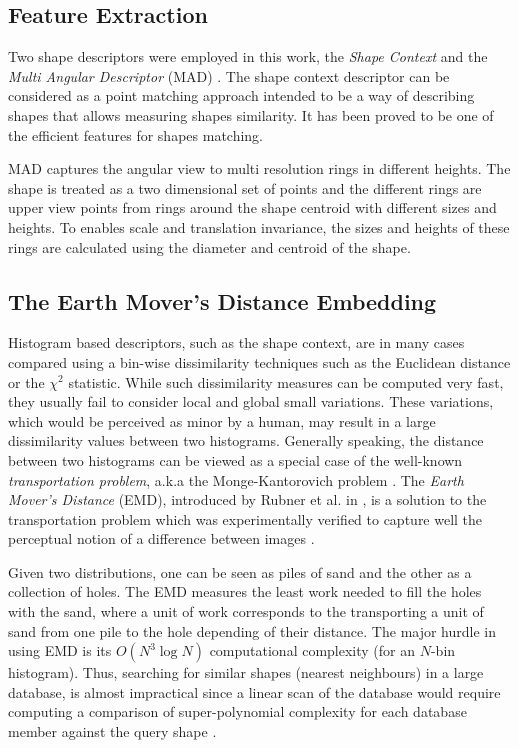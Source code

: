 \documentclass[10pt, conference, compsocconf]{IEEEtran}
\begin{document}
\subsection{Feature Extraction}
Two shape descriptors were employed in this work, the \emph{Shape Context} \cite{belongie2002shape} and the \emph{Multi Angular Descriptor} (MAD) \cite{saabni2013multi}.
The shape context descriptor can be considered as a point matching approach intended to be a way of describing shapes that allows measuring shapes similarity. 
It has been proved to be one of the efficient features for shapes matching.

MAD captures the angular view to multi resolution rings in different heights. 
The shape is treated as a two dimensional set of points and the different rings are upper view points from rings around the shape centroid with different sizes and heights. 
To enables scale and translation invariance, the sizes and heights of these rings are calculated using the diameter and centroid of the shape.

\subsection{The Earth Mover's Distance Embedding}
Histogram based descriptors, such as the shape context, are in many cases compared using a bin-wise dissimilarity techniques such as the Euclidean distance or the $\chi^2$ statistic.
While such dissimilarity measures can be computed very fast, they usually fail to consider local and global small variations. 
These variations, which would be perceived as minor by a human, may result in a large dissimilarity values between two histograms. 
Generally speaking, the distance between two histograms can be viewed as a special case of the well-known \emph{transportation problem}, a.k.a the Monge-Kantorovich problem \cite{rachev1985monge}.
The \emph{Earth Mover's Distance} (EMD), introduced by Rubner et al. in \cite{rubner2000earth}, is a solution to the transportation problem which was experimentally verified to capture well the perceptual notion of a difference between images \cite{grauman2004fast}.

Given two distributions, one can be seen as piles of sand and the other as a collection of holes. 
The EMD measures the least work needed to fill the holes with the sand, where a unit of work corresponds to the transporting a unit of sand from one pile to the hole depending of their distance.
The major hurdle in using EMD is its $O\left( {{N^3}\log N} \right)$ computational complexity (for an $N$-bin histogram). 
Thus, searching for similar shapes (nearest neighbours) in a large database, is almost impractical since a linear scan of the database would require computing a comparison of super-polynomial complexity for each database member against the query shape \cite{saabni2013efficient}. 
\end{document}
